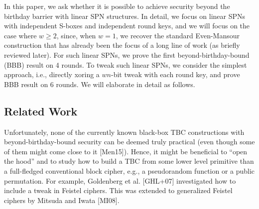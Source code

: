 In this paper, we ask whether it is possible to achieve security beyond the birthday barrier with linear SPN structures. In detail, we focus on linear SPNs with independent S-boxes and independent round keys, and we will focus on the case where $w\geq2$, since, when $w = 1$, we recover the standard Even-Mansour construction that has already been the focus
of a long line of work (as briefly reviewed later). For such linear SPNs, we prove the first beyond-birthday-bound (BBB) result on 4 rounds. To tweak such linear SPNs, we consider the simplest approach, i.e., directly xoring a $wn$-bit tweak with each round key, and prove BBB result on 6 rounds. We will elaborate in detail as follows.



\medskip{}



\medskip{}








\subsection{Related Work}


Unfortunately, none of the currently known black-box
TBC constructions with beyond-birthday-bound security can be deemed truly practical (even
though some of them might come close to it [Men15]). Hence, it might be beneficial to “open
the hood” and to study how to build a TBC from some lower level primitive than a full-fledged
conventional block cipher, e.g., a pseudorandom function or a public permutation. For example,
Goldenberg et al. [GHL+07] investigated how to include a tweak in Feistel ciphers. This was
extended to generalized Feistel ciphers by Mitsuda and Iwata [MI08].




